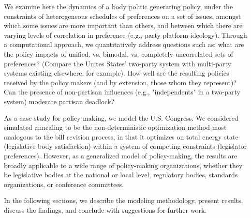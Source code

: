 \documentclass[pdftex,12pt]{llncs}
\begin{document}
We examine here the dynamics of a body politic generating policy, under the constraints of heterogeneous schedules of preferences on a set of issues, amongst which some issues are more important than others, and between which there are varying levels of correlation in preference (e.g., party platform ideology).
Through a computational approach, we quantitatively address questions such as: what are the policy impacts of unified, vs. bimodal, vs. completely uncorrelated sets of preferences?
(Compare the Unites States' two-party system with multi-party systems existing elsewhere, for example).
How well are the resulting policies received by the policy makers (and by extension, those whom they represent)?
Can the presence of non-partisan influences (e.g., "independents" in a two-party system) moderate partisan deadlock?

As a case study for policy-making, we model the U.S. Congress.
We considered simulated annealing to be the non-deterministic optimization method most analogous to the bill revision process, in that it optimizes on total energy state (legislative body satisfaction) within a system of competing constraints (legislator preferences).
However, as a generalized model of policy-making, the results are broadly applicable to a wide range of policy-making organizations, whether they be legislative bodies at the national or local level, regulatory bodies, standards organizations, or conference committees.

In the following sections, we describe the modeling methodology, present results, discuss the findings, and conclude with suggestions for further work.
\end{document}
